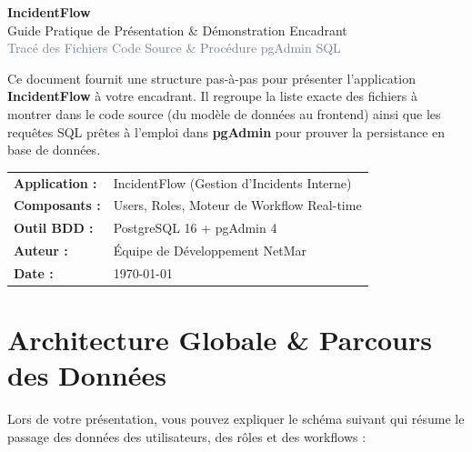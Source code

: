 \documentclass[11pt,a4paper]{article}
\begin{document}
\begin{titlepage}
    \centering
    \vspace*{1.5cm}
    
    {\Huge \bfseries \textcolor{navyprimary}{IncidentFlow}}\\[0.4cm]
    {\Large \textcolor{blueaccent}{Guide Pratique de Présentation \& Démonstration Encadrant}}\\[0.2cm]
    {\large \textcolor{slategray}{Tracé des Fichiers Code Source \& Procédure pgAdmin SQL}}\\[1.5cm]
    
    \begin{tcolorbox}[colback=blueaccent!5,colframe=blueaccent,arc=6pt,title=\textbf{Objectif du Support}]
    Ce document fournit une structure pas-à-pas pour présenter l'application \textbf{IncidentFlow} à votre encadrant. Il regroupe la liste exacte des fichiers à montrer dans le code source (du modèle de données au frontend) ainsi que les requêtes SQL prêtes à l'emploi dans \textbf{pgAdmin} pour prouver la persistance en base de données.
    \end{tcolorbox}

    \vfill
    
    \begin{tabular}{ll}
        \textbf{Application :} & IncidentFlow (Gestion d'Incidents Interne) \\
        \textbf{Composants :} & Users, Roles, Moteur de Workflow Real-time \\
        \textbf{Outil BDD :} & PostgreSQL 16 + pgAdmin 4 \\
        \textbf{Auteur :} & Équipe de Développement NetMar \\
        \textbf{Date :} & \today \\
    \end{tabular}
    
    \vspace*{0.8cm}
\end{titlepage}

\tableofcontents
\newpage

\section{Architecture Globale \& Parcours des Données}

Lors de votre présentation, vous pouvez expliquer le schéma suivant qui résume le passage des données des utilisateurs, des rôles et des workflows :
\end{document}
